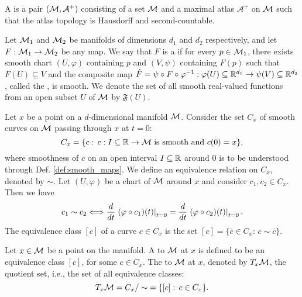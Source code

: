 \documentclass[11pt,a4paper]{article}
\begin{document}
\begin{mydef}
A  is a pair $(\mathcal{M}, \mathcal{A}^+)$ consisting of a set $\mathcal{M}$ and a maximal atlas $\mathcal{A}^+$ on $\mathcal{M}$ such that the atlas topology is Hausdorff and second-countable.
\end{mydef}

\begin{mydef}\label{def:smooth_maps}
Let $\mathcal{M}_1$ and $\mathcal{M}_2$ be manifolds of dimensions $d_1$ and $d_2$ respectively, and let $F:\mathcal{M}_1\rightarrow \mathcal{M}_2$ be any map. We say that $F$ is a  if for every $p\in \mathcal{M}_1$, there exists smooth chart $(U,\varphi)$ containing $p$ and $(V,\psi)$ containing $F(p)$ such that $F(U)\subseteq V$ and the composite map  $\hat{F} = \psi\circ F\circ \varphi^{-1}:\varphi(U)\subseteq \mathbb{R}^{d_1}\rightarrow \psi(V)\subseteq \mathbb{R}^{d_2}$, called the , is smooth. We denote the set of all smooth real-valued functions from an open subset $U$ of $\mathcal{M}$ by $\mathfrak{F}(U)$.
\end{mydef}

Let $x$ be a point on a $d$-dimensional manifold $\mathcal{M}$. Consider the set $C_x$ of smooth curves on $\mathcal{M}$ passing through $x$ at $t=0$:
\begin{equation*}
    C_x = \{ c:\, c:I\subseteq \mathbb{R}\rightarrow \mathcal{M}\text{ is smooth and }c(0) = x \},
\end{equation*}
where smoothness of $c$ on an open interval $I\subseteq \mathbb{R}$ around $0$ is to be understood through Def. \ref{def:smooth_maps}. We define an equivalence relation on $C_x$, denoted by $\sim$. Let $(U,\varphi)$ be a chart of $\mathcal{M}$ around $x$ and consider $c_1,c_2\in C_x$. Then we have
\begin{equation*}
    c_1\sim c_2 \Longleftrightarrow \dfrac{d}{dt}\left.(\varphi\circ c_1)(t)\right|_{t=0} = \dfrac{d}{dt}\left.(\varphi\circ c_2)(t)\right|_{t=0}.
\end{equation*}
The equivalence class $[c]$ of a curve $c\in C_x$ is the set $[c] = \{\bar{c}\in C_x:\, c\sim \bar{c}\}.$

\begin{mydef}
Let $x\in \mathcal{M}$ be a point on the manifold. A  to $\mathcal{M}$ at $x$ is defined to be an equivalence class $[c]$, for some $c\in C_x$. The  to $\mathcal{M}$ at $x$, denoted by $T_x\mathcal{M}$, the quotient set, i.e., the set of all equivalence classes:
\begin{equation*}
T_x\mathcal{M} = C_x/\sim\;= \{[c]:\, c\in C_x\}.
\end{equation*}
\end{mydef}
\end{document}
